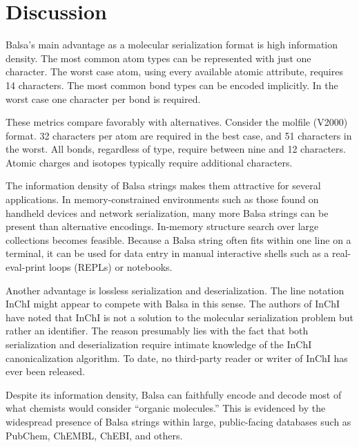\documentclass{article}
\begin{document}
\section*{Discussion}

Balsa's main advantage as a molecular serialization format is high information density. The most common atom types can be represented with just one character. The worst case atom, using every available atomic attribute, requires 14 characters. The most common bond types can be encoded implicitly. In the worst case one character per bond is required.

These metrics compare favorably with alternatives. Consider the molfile (V2000) format. 32 characters per atom are required in the best case, and 51 characters in the worst. All bonds, regardless of type, require between nine and 12 characters. Atomic charges and isotopes typically require additional characters.

The information density of Balsa strings makes them attractive for several applications. In memory-constrained environments such as those found on handheld devices and network serialization, many more Balsa strings can be present than alternative encodings. In-memory structure search over large collections becomes feasible. Because a Balsa string often fits within one line on a terminal, it can be used for data entry in manual interactive shells such as a real-eval-print loops (REPLs) or notebooks.

Another advantage is lossless serialization and deserialization. The line notation InChI might appear to compete with Balsa in this sense. The authors of InChI have noted that InChI is not a solution to the molecular serialization problem but rather an identifier.\cite{heller:2015} The reason presumably lies with the fact that both serialization and deserialization require intimate knowledge of the InChI canonicalization algorithm. To date, no third-party reader or writer of InChI has ever been released.

Despite its information density, Balsa can faithfully encode and decode most of what chemists would consider \enquote{organic molecules.} This is evidenced by the widespread presence of Balsa strings within large, public-facing databases such as PubChem,\cite{kim:2016} ChEMBL,\cite{gaulton:2012} ChEBI,\cite{degtyarenko:2007} and others.
\end{document}
